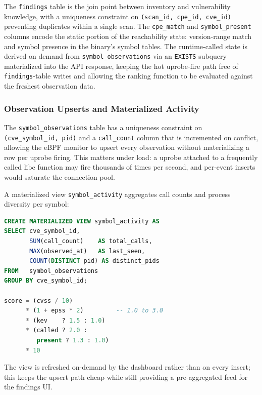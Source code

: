 \documentclass[conference]{IEEEtran}
\begin{document}
The \texttt{findings} table is the join point between inventory and vulnerability knowledge, with a uniqueness constraint on \texttt{(scan\_id, cpe\_id, cve\_id)} preventing duplicates within a single scan.
The \texttt{cpe\_match} and \texttt{symbol\_present} columns encode the static portion of the reachability state: version-range match and symbol presence in the binary's symbol tables.
The runtime-called state is derived on demand from \texttt{symbol\_observations} via an \texttt{EXISTS} subquery materialized into the API response, keeping the hot uprobe-fire path free of \texttt{findings}-table writes and allowing the ranking function to be evaluated against the freshest observation data.

\subsubsection{Observation Upserts and Materialized Activity}

The \texttt{symbol\_observations} table has a uniqueness constraint on \texttt{(cve\_symbol\_id, pid)} and a \texttt{call\_count} column that is incremented on conflict, allowing the eBPF monitor to upsert every observation without materializing a row per uprobe firing.
This matters under load: a uprobe attached to a frequently called libc function may fire thousands of times per second, and per-event inserts would saturate the connection pool.

A materialized view \texttt{symbol\_activity} aggregates call counts and process diversity per symbol:

\begin{lstlisting}[language=SQL,numbers=none,
  caption={Definition of the \texttt{symbol\_activity} materialized
    view and \texttt{compute\_rank\_score} function. The \texttt{called}
    and \texttt{present} arguments are computed at query time from
    \texttt{symbol\_observations} and \texttt{cve\_symbols.validated}
    respectively.},
  label={lst:symbol-activity}]
CREATE MATERIALIZED VIEW symbol_activity AS
SELECT cve_symbol_id,
       SUM(call_count)    AS total_calls,
       MAX(observed_at)   AS last_seen,
       COUNT(DISTINCT pid) AS distinct_pids
FROM   symbol_observations
GROUP BY cve_symbol_id;

score = (cvss / 10)
      * (1 + epss * 2)         -- 1.0 to 3.0
      * (kev    ? 1.5 : 1.0)
      * (called ? 2.0 :
         present ? 1.3 : 1.0)
      * 10
\end{lstlisting}

The view is refreshed on-demand by the dashboard rather than on every insert; this keeps the upsert path cheap while still providing a pre-aggregated feed for the findings UI.
\end{document}
